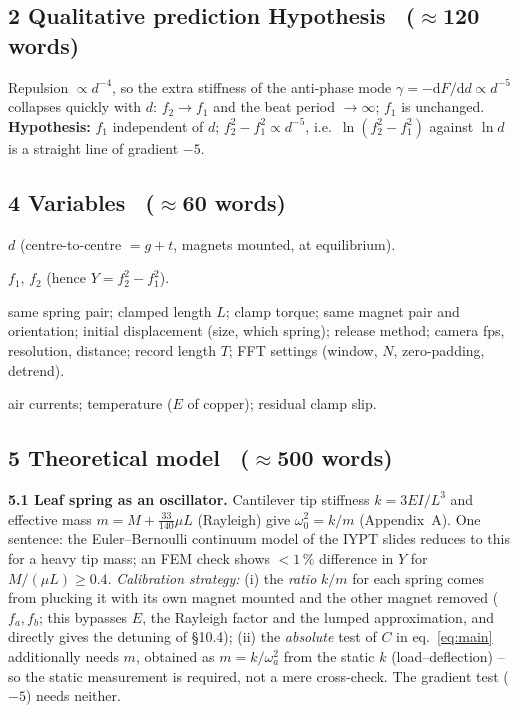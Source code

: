 \documentclass[11pt,a4paper]{article}
\newcommand{\Y}{Y}                       %
\newcommand{\words}[1]{~{\small\color{gray}($\approx$#1 words)}}
\begin{document}
\subsection*{2 Qualitative prediction  Hypothesis \words{120}}
Repulsion $\propto d^{-4}$, so the extra stiffness of the anti-phase mode
$\gamma=-\mathrm dF/\mathrm dd\propto d^{-5}$ collapses quickly with $d$: $f_2\to f_1$ and the
beat period $\to\infty$; $f_1$ is unchanged.\\
\textbf{Hypothesis:} $f_1$ independent of $d$; $f_2^2-f_1^2\propto d^{-5}$, i.e.\
$\ln(f_2^2-f_1^2)$ against $\ln d$ is a straight line of gradient $-5$.

\subsection*{4 Variables \words{60}}
\begin{description}[leftmargin=2.6cm,style=sameline]
\item[Independent] $d$ (centre-to-centre $=g+t$, magnets mounted, at equilibrium).
\item[Dependent] $f_1$, $f_2$ (hence $\Y=f_2^2-f_1^2$).
\item[Controlled] same spring pair; clamped length $L$; clamp torque; same magnet pair and
orientation; initial displacement (size, which spring); release method; camera fps,
resolution, distance; record length $T$; FFT settings (window, $N$, zero-padding, detrend).
\item[Uncontrolled] air currents; temperature ($E$ of copper); residual clamp slip.
\end{description}

\subsection*{5 Theoretical model \words{500}}
\textbf{5.1 Leaf spring as an oscillator.} Cantilever tip stiffness $k=3EI/L^3$ and effective
mass $m=M+\tfrac{33}{140}\mu L$ (Rayleigh) give $\omega_0^2=k/m$ (Appendix~A). One sentence:
the Euler--Bernoulli continuum model of the IYPT slides reduces to this for a heavy tip mass;
an FEM check shows $<1\,\%$ difference in $\Y$ for $M/(\mu L)\ge0.4$.
\emph{Calibration strategy:} (i) the \emph{ratio} $k/m$ for each spring comes from plucking
it with its own magnet mounted and the other magnet removed ($f_{a},f_{b}$; this bypasses $E$,
the Rayleigh factor and the lumped approximation, and directly gives the detuning of \S10.4);
(ii) the \emph{absolute} test of $C$ in eq.~\eqref{eq:main} additionally needs $m$, obtained
as $m=k/\omega_a^2$ from the static $k$ (load--deflection) -- so the static measurement is
required, not a mere cross-check. The gradient test ($-5$) needs neither.
\end{document}

